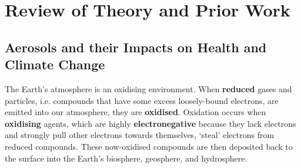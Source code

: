 \chapter{Review of Theory and Prior Work} \label{txt:background-chapter}

\section{Aerosols and their Impacts on Health and Climate Change} \label{txt:aerosols}

The Earth's atmosphere is an oxidising environment. When \textbf{reduced} gases and particles, i.e. compounds that have some excess loosely-bound electrons, are emitted into our atmosphere, they are \textbf{oxidised}. Oxidation occurs when \textbf{oxidising} agents, which are highly \textbf{electronegative} because they lack electrons and strongly pull other electrons towards themselves, `steal' electrons from reduced compounds. These now-oxidised compounds are then deposited back to the surface into the Earth's biosphere, geosphere, and hydrosphere.

